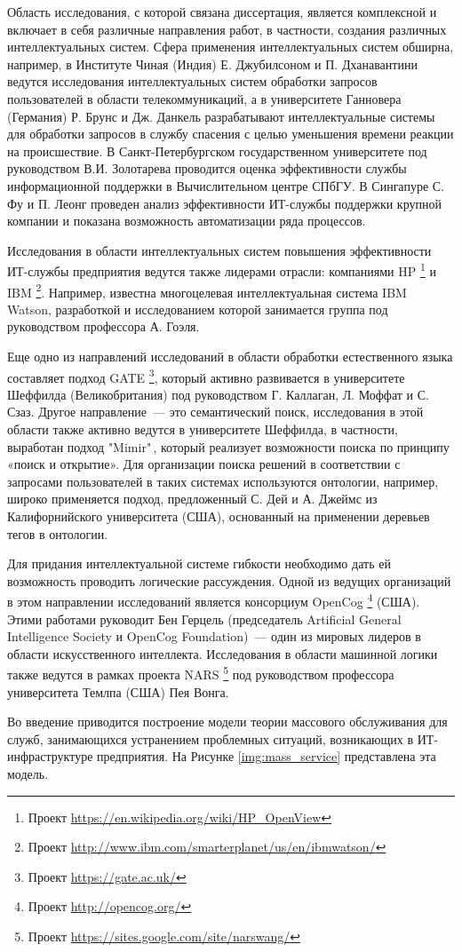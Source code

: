Область исследования, с которой связана диссертация, является комплексной и включает в себя различные направления работ, в частности, создания различных интеллектуальных систем. Сфера применения интеллектуальных систем обширна, например, в Институте Чиная (Индия) Е. Джубилсоном и П. Дханавантини ведутся исследования интеллектуальных систем обработки запросов пользователей в области телекоммуникаций, а в университете Ганновера (Германия) Р. Брунс и Дж. Данкель разрабатывают интеллектуальные системы для обработки запросов в службу спасения с целью уменьшения времени реакции на происшествие. В Санкт-Петербургском государственном университете под руководством В.И. Золотарева проводится оценка эффективности службы информационной поддержки в Вычислительном центре СПбГУ. В Сингапуре С. Фу и П. Леонг проведен анализ эффективности ИТ-службы поддержки крупной компании и показана возможность автоматизации ряда процессов.\par
Исследования в области интеллектуальных систем повышения эффективности ИТ-службы предприятия ведутся также лидерами отрасли: компаниями HP \footnote{Проект \url{https://en.wikipedia.org/wiki/HP_OpenView}} и IBM \footnote{Проект \url{http://www.ibm.com/smarterplanet/us/en/ibmwatson/}}. Например, известна многоцелевая интеллектуальная система IBM Watson, разработкой и исследованием которой занимается группа под руководством профессора А. Гоэля.  \par   

Еще одно из направлений исследований в области обработки естественного языка составляет подход GATE \footnote{Проект \url{https://gate.ac.uk/}}, который активно развивается в университете Шеффилда (Великобритания) под руководством Г. Каллаган, Л. Моффат и С. Сзаз. Другое направление~--- это семантический поиск, исследования в этой области также активно ведутся в университете Шеффилда, в частности, выработан подход "Mimir"\,, который реализует возможности поиска по принципу «поиск и открытие». Для организации поиска решений в соответствии с запросами пользователей в таких системах используются онтологии, например, широко применяется подход, предложенный С. Дей и А. Джеймс из Калифорнийского университета (США), основанный на применении деревьев тегов в онтологии. \par
Для придания интеллектуальной системе гибкости необходимо дать ей возможность проводить логические рассуждения. Одной из ведущих организаций в этом направлении исследований является консорциум OpenCog \footnote{Проект \url{http://opencog.org/}} (США). Этими работами руководит Бен Герцель (председатель Artificial General Intelligence Society и OpenCog Foundation)~--- один из мировых лидеров в области искусственного интеллекта. Исследования в области машинной логики также ведутся в рамках проекта NARS \footnote{Проект \url{https://sites.google.com/site/narswang/}} под руководством профессора университета Темлпа (США) Пея Вонга. \par 
Во введение приводится построение модели теории массового обслуживания для служб, занимающихся устранением проблемных ситуаций, возникающих в ИТ-инфраструктуре предприятия. На Рисунке \ref{img:mass_service} представлена эта модель. 
  
